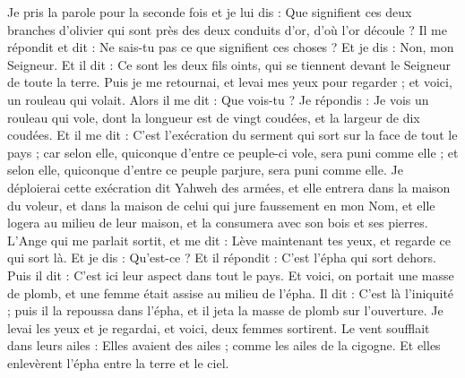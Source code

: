 \begin{multicols}{2}
Je pris la parole pour la seconde fois et je lui dis : Que signifient ces deux branches d'olivier qui sont près des deux conduits d'or, d'où l'or découle ?
Il me répondit et dit : Ne sais-tu pas ce que signifient ces choses ? Et je dis : Non, mon Seigneur.
Et il dit : Ce sont les deux fils oints, qui se tiennent devant le Seigneur de toute la terre.
\VerseOne{}Puis je me retournai, et levai mes yeux pour regarder ; et voici, un rouleau qui volait.
Alors il me dit : Que vois-tu ? Je répondis : Je vois un rouleau qui vole, dont la longueur est de vingt coudées, et la largeur de dix coudées.
Et il me dit : C'est l'exécration du serment qui sort sur la face de tout le pays ; car selon elle, quiconque d'entre ce peuple-ci vole, sera puni comme elle ; et selon elle, quiconque d'entre ce peuple parjure, sera puni comme elle.
Je déploierai cette exécration dit Yahweh des armées, et elle entrera dans la maison du voleur, et dans la maison de celui qui jure faussement en mon Nom, et elle logera au milieu de leur maison, et la consumera avec son bois et ses pierres.
L'Ange qui me parlait sortit, et me dit : Lève maintenant tes yeux, et regarde ce qui sort là.
Et je dis : Qu'est-ce ? Et il répondit : C'est l'épha qui sort dehors. Puis il dit : C'est ici leur aspect dans tout le pays.
Et voici, on portait une masse de plomb, et une femme était assise au milieu de l'épha.
Il dit : C'est là l'iniquité ; puis il la repoussa dans l'épha, et il jeta la masse de plomb sur l'ouverture.
Je levai les yeux et je regardai, et voici, deux femmes sortirent. Le vent soufflait dans leurs ailes : Elles avaient des ailes ; comme les ailes de la cigogne. Et elles enlevèrent l'épha entre la terre et le ciel.

\end{multicols}

